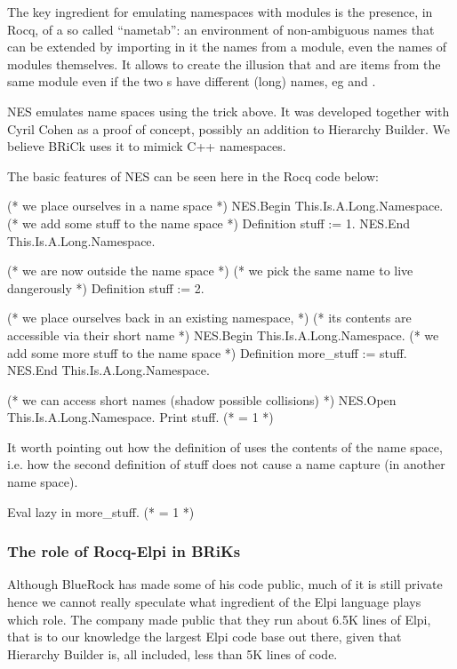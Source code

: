\documentclass[a4paper, 11pt]{book}
\begin{document}
The key ingredient for emulating namespaces with modules is the presence,
in Rocq, of a so called ``nametab'': an environment of non-ambiguous names
that can be extended by importing in it the names from a module, even the
names of modules themselves. It allows to create the illusion that 
and  are items from the same module  even if
the two s have different (long) names, eg 
and .

NES emulates name spaces using the trick above. It was developed
together with Cyril Cohen as a proof of concept, possibly an addition
to Hierarchy Builder. We believe BRiCk uses it to mimick C++ namespaces.

The basic features of NES can be seen here in the Rocq code below:

\begin{rocqcode}
(* we place ourselves in a name space *)
NES.Begin This.Is.A.Long.Namespace.
  (* we add some stuff to the name space *)
  Definition stuff := 1.
NES.End This.Is.A.Long.Namespace.

(* we are now outside the name space *)
(* we pick the same name to live dangerously *)
Definition stuff := 2.

(* we place ourselves back in an existing namespace, *)
(* its contents are accessible via their short name *)
NES.Begin This.Is.A.Long.Namespace.
  (* we add some more stuff to the name space *)
  Definition more_stuff := stuff.
NES.End This.Is.A.Long.Namespace.

(* we can access short names (shadow possible collisions) *)
NES.Open This.Is.A.Long.Namespace.
Print stuff. (* = 1 *)
\end{rocqcode}

It worth pointing out how the definition of 
uses the contents of the name space, i.e. how the second definition
of stuff does not cause a name capture (in another name space).

\begin{rocqcode}
Eval lazy in more_stuff. (* = 1 *)
\end{rocqcode}

\subsubsection{The role of Rocq-Elpi in BRiKs}

Although BlueRock has made some of his code public, much of it is still
private hence we cannot really speculate what ingredient of the Elpi
language plays which role.
The company made public that they run about 6.5K lines of Elpi, that is
to our knowledge the largest Elpi code base out there, given that Hierarchy
Builder is, all included, less than 5K lines of code.
\end{document}

